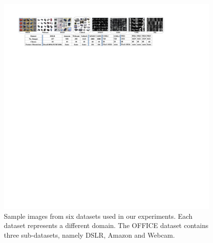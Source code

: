 \documentclass[journal,twocolumn]{IEEEtran}
\begin{document}
\begin{CJK*}{UTF8}{gkai}
						
\begin{figure}[h!]
	\centering
	\includegraphics[width=0.95\linewidth]{database.pdf}
	\caption { Sample images from six datasets used in our experiments. Each dataset represents a different domain. The OFFICE dataset contains three sub-datasets, namely DSLR, Amazon and Webcam.} 
	\label{fig:data}	
\end{figure} 						
							


\end{CJK*}
\end{document}
